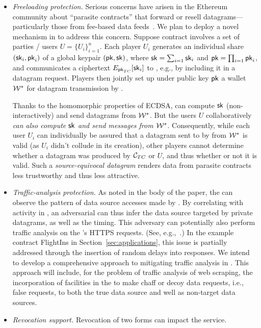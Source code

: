 \begin{itemize}
\item{\em Freeloading protection.} Serious concerns have  arisen in the Ethereum community about ``parasite contracts'' that forward or resell datagrams---particularly those from fee-based data feeds~\cite{parasite}. We plan to deploy a novel mechanism in \tc to address this concern. Suppose contract \reqcont involves a set of parties / users $U = \{U_i\}_{i=1}^n$. Each player $U_i$ generates an individual share $({\sf sk}_i, {\sf pk}_i)$ of a global keypair $({\sf pk}, {\sf sk})$, where ${\sf sk} = \sum_{i=1} {\sf sk}_i$ and ${\sf pk} = \prod_{i=1} {\sf pk}_i$, and communicates a ciphertext $E_{{\sf pk}_{TC}}[{\sf sk}_i]$ to \tcont, e.g., by including it in a datagram request. Players then jointly set  up under public key ${\sf pk}$ a wallet ${\cal W}^*$ for datagram transmission by \tcont. 

Thanks to the homomorphic properties of ECDSA, \tcont can compute ${\sf sk}$ (non-interactively) and send datagrams from ${\cal W}^*$. But the users $U$ collaboratively \emph{can also compute ${\sf sk}$ and send messages from ${\cal W}^*$}. Consequently, while each user $U_i$ can individually be assured that a datagram sent to \reqcont by \tcont from ${\cal W}^*$ is valid (as $U_i$ didn't collude in its creation), other players cannot determine whether a datagram was produced by ${\cal C}_{TC}$ or $U$, and thus whether or not it is valid. Such a \emph{source-equivocal datagram} renders data from parasite contracts less trustworthy and thus less attractive. 
\item{\em Traffic-analysis protection.} As noted in the body of the paper, the \medname can observe the pattern of data source accesses made by \tc. By correlating with activity in \tcont, an adversarial \medname can thus infer the data source targeted by private datagrams, as well as the timing. This adversary can potentially also perform traffic analysis on the \encname's HTTPS requests. (See, e.g.,~\cite{chen2010side}.) In the example contract {\sf FlightIns} in Section~\ref{sec:applications}, this issue is partially addressed through the insertion of random delays into \tc responses. We intend to develop a comprehensive approach to mitigating traffic analysis in \tc. This approach will include, for the problem of traffic analysis of web scraping, the incorporation of facilities in the \encname to make chaff or decoy data requests, i.e., false requests, to both the true data source and well as non-target data sources. 

\item{\em Revocation support.} Revocation of two forms can impact the \tc service. 


\end{itemize}

